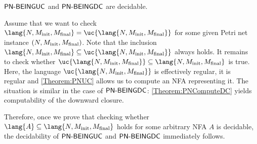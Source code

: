 \documentclass[../../diss.tex]{subfiles}
\begin{document}
\begin{theorem}%
\label{Theorem:PNCOVUCDCDecidable}%
    $\mathsf{PN\text{-}BEINGUC}$ and $\mathsf{PN\text{-}BEINGDC}$ are decidable.
\end{theorem}

Assume that we want to check $\lang{N,\Minit,\Mfinal} = \uc{\lang{N,\Minit,\Mfinal}}$ for some given Petri net instance $(N,M_{\text{init}},M_{\text{final}})$.
Note that the inclusion $\lang{N,\Minit,\Mfinal} \subseteq \uc{\lang{N,\Minit,\Mfinal}}$ always holds.
It remains to check whether $\uc{\lang{N,\Minit,\Mfinal}} \subseteq \lang{N,\Minit,\Mfinal}$ is true.
Here, the language $\uc{\lang{N,\Minit,\Mfinal}}$ is effectively regular, \ie it is regular and \cref{Theorem:PNUC} allows us to compute an NFA representing it.
The situation is similar in the case of $\mathsf{PN\text{-}BEINGDC}$: \cref{Theorem:PNComputeDC} yields computability of the downward closure.

Therefore, once we prove that checking whether $\lang{A} \subseteq \lang{N,\Minit,\Mfinal}$ holds for some arbitrary NFA $A$ is decidable, the decidability of $\mathsf{PN\text{-}BEINGUC}$ and $\mathsf{PN\text{-}BEINGDC}$ immediately follows.
\end{document}
